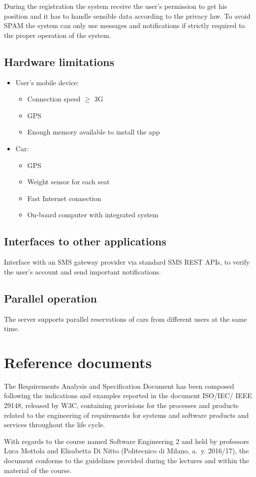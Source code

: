 During the registration the system receive the user's permission to get his position and it has to handle sensible data according to the privacy law. To avoid SPAM the system can only use messages and notifications if strictly required to the proper operation of the system.

\subsection{Hardware limitations}
\begin{itemize}
	\item User's mobile device:
\begin{itemize}
	\item Connection speed \(\geqslant\) 3G
	\item GPS
	\item Enough memory available to install the app
\end{itemize}
	\item Car:
	\begin{itemize}
	\item GPS
	\item Weight sensor for each seat
	\item Fast Internet connection
	\item On-board computer with integrated system
\end{itemize}
\end{itemize}

\subsection{Interfaces to other applications}
Interface with an SMS gateway provider via standard SMS REST APIs, to verify the user's account and send important notifications.

\subsection{Parallel operation}
The server supports parallel reservations of cars from different users at the same time.

\section{Reference documents}
The Requirements Analysis and Specification Document has been composed following the indications and examples reported in the document ISO/IEC/ IEEE 29148, released by W3C, containing provisions for the processes and products related to the engineering of requirements for systems and software products and services throughout the life cycle.

With regards to the course named Software Engineering 2 and held by professors Luca Mottola and Elisabetta Di Nitto (Politecnico di Milano, a.~y. 2016/17), the document conforms to the guidelines provided during the lectures and within the material of the course.